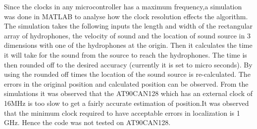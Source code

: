 Since the clocks in any microcontroller has a maximum frequency,a simulation was done in MATLAB to analyse how the clock resolution effects the algorithm. The simulation takes the following inputs the length and width of the rectangular array of hydrophones, the velocity of sound and the location of sound source in 3 dimensions with one of the hydrophones at the origin. Then it calculates the time it will take for the sound from the source to reach the hydrophones. The time is then rounded off to the desired accuracy (currently it is set to micro seconds). By using the rounded off times the location of the sound source is re-calculated. The errors in the original position and calculated position can be observed.\newline
From the simulations it was observed that the AT90CAN128 which has an external clock of 16MHz is too slow to get a fairly accurate estimation of position.\newline It was observed that the minimum clock required to have acceptable errors in localization is 1 GHz. Hence the code was not tested on AT90CAN128.
%